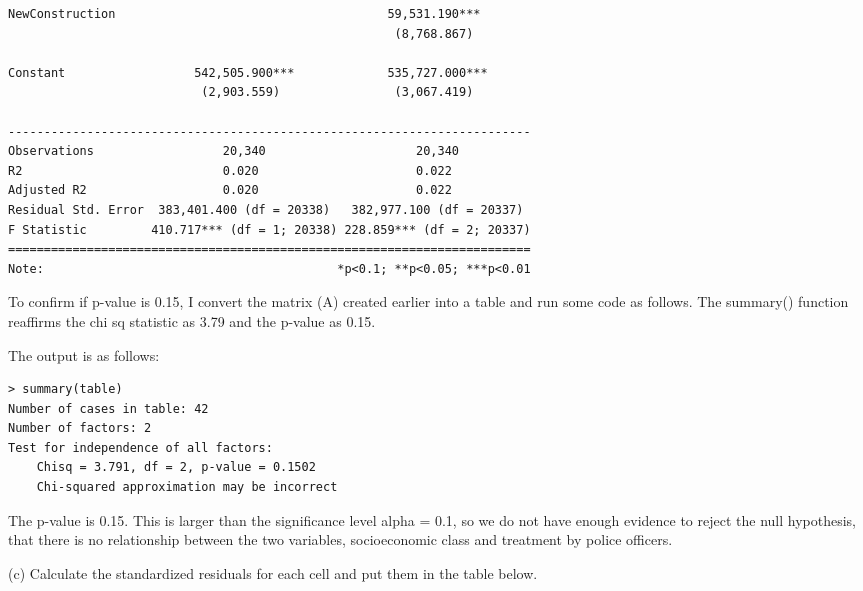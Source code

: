 \documentclass[12pt,letterpaper]{article}
\begin{document}
\begin{verbatim}
NewConstruction                                      59,531.190***       
                                                      (8,768.867)        
                                                                         
Constant                  542,505.900***             535,727.000***      
                           (2,903.559)                (3,067.419)        
                                                                         
-------------------------------------------------------------------------
Observations                  20,340                     20,340          
R2                            0.020                      0.022           
Adjusted R2                   0.020                      0.022           
Residual Std. Error  383,401.400 (df = 20338)   382,977.100 (df = 20337) 
F Statistic         410.717*** (df = 1; 20338) 228.859*** (df = 2; 20337)
=========================================================================
Note:                                         *p<0.1; **p<0.05; ***p<0.01
\end{verbatim}
\noindent To confirm if p-value is 0.15, I convert the matrix (A) created earlier into a table and run some code as follows. The summary() function reaffirms the chi sq statistic as 3.79 and the p-value as 0.15.\\
\vspace{.5cm}
  
\vspace{.5cm}
\noindent The output is as follows:\\
\begin{verbatim}
> summary(table)
Number of cases in table: 42 
Number of factors: 2 
Test for independence of all factors:
	Chisq = 3.791, df = 2, p-value = 0.1502
	Chi-squared approximation may be incorrect
\end{verbatim}
\noindent The p-value is 0.15. This is larger than the significance level alpha = 0.1, so we do not have enough evidence to reject the null hypothesis, that there is no relationship between the two variables, socioeconomic class and treatment by police officers.\\
	
	\newpage
	\item [(c)] Calculate the standardized residuals for each cell and put them in the table below.
	\vspace{1cm}
	
\end{document}

